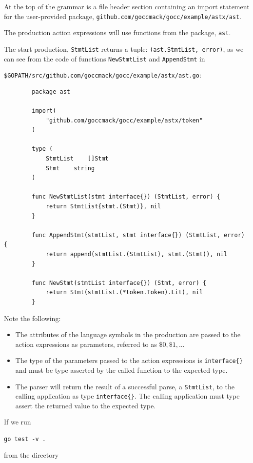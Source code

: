 \documentclass[12pt]{article}
\begin{document}
	At the top of the grammar is a file header section containing an import statement for the user-provided package,
	\verb|github.com/goccmack/gocc/example/astx/ast|.

	The production action expressions will use functions from the package, \verb|ast|.

	The start production, \verb"StmtList" returns a tuple: \verb|(ast.StmtList, error)|, as we can see from the code of functions
	\verb|NewStmtList| and \verb|AppendStmt| in

	\verb|$GOPATH/src/github.com/goccmack/gocc/example/astx/ast.go|:

	\begin{verbatim}
		package ast

		import(
		    "github.com/goccmack/gocc/example/astx/token"
		)

		type (
		    StmtList	[]Stmt
		    Stmt 	string
		)

		func NewStmtList(stmt interface{}) (StmtList, error) {
		    return StmtList{stmt.(Stmt)}, nil
		}

		func AppendStmt(stmtList, stmt interface{}) (StmtList, error) {
		    return append(stmtList.(StmtList), stmt.(Stmt)), nil
		}

		func NewStmt(stmtList interface{}) (Stmt, error) {
		    return Stmt(stmtList.(*token.Token).Lit), nil
		}
	\end{verbatim}

	Note the following:

	\begin{itemize}
		\item The attributes of the language symbols in the production are passed to the action expressions as parameters, referred to as $\$0, \$1, ...$

		\item The type of the parameters passed to the action expressions is \verb|interface{}| and must be type asserted by the called function to the expected type.

		\item The parser will return the result of a successful parse, a \verb"StmtList", to the calling application as type \verb"interface{}". The calling application must type assert the returned value to the expected type.
	\end{itemize}

	If we run

	\verb"go test -v ."

	from the directory
\end{document}

